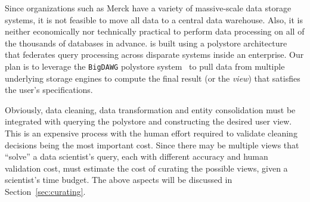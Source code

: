  Since organizations such as
Merck have a variety of massive-scale data storage systems, it is not feasible
to move all data to a central data warehouse. Also, it is neither economically
nor technically practical to perform data processing on all of the thousands of
databases in advance.  \dcv is built using a polystore
architecture~\cite{DBLP:journals/sigmod/DugganESBHKMMMZ15} that federates query
processing across disparate systems inside an enterprise. Our plan is to
leverage the \texttt{BigDAWG} polystore
system~\cite{DBLP:journals/pvldb/ElmoreDSBCGHHKK15} to pull data from multiple
underlying storage engines to compute the final result (or the {\em view}) that
satisfies the user's specifications.


Obviously, data cleaning, data transformation and entity consolidation must be
integrated with querying the polystore and constructing the desired user view.
This is an expensive process with the human effort required to validate cleaning
decisions being the most important cost.  Since there may be multiple views that
``solve'' a data scientist's query, each with different accuracy and human
validation cost, \dcv must estimate the cost of curating the possible views,
given a scientist's time budget.  The above aspects will be discussed in
Section~\ref{sec:curating}.





